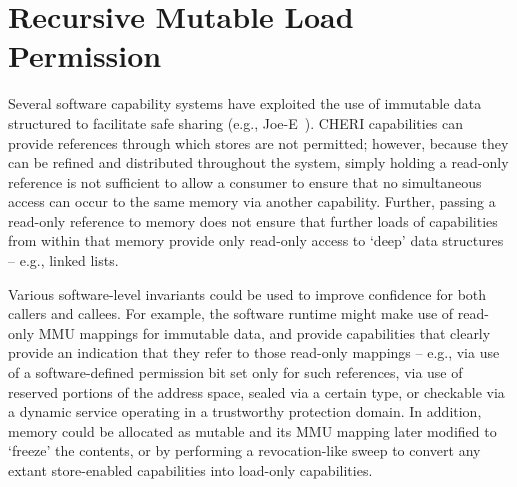 \section{Recursive Mutable Load Permission} %
\label{app:exp:recmutload}


Several software capability systems have exploited the use of immutable data
structured to facilitate safe sharing (e.g., Joe-E~\cite{mettler:joee}).
CHERI capabilities can provide references through which stores are not
permitted; however, because they can be refined and distributed throughout the
system, simply holding a read-only reference is not sufficient to allow a
consumer to ensure that no simultaneous access can occur to the same memory
via another capability.
Further, passing a read-only reference to memory does not ensure that further
loads of capabilities from within that memory provide only read-only access to
`deep' data structures -- e.g., linked lists.

Various software-level invariants could be used to improve confidence for both
callers and callees.
For example, the software runtime might make use of read-only MMU mappings for
immutable data, and provide capabilities that clearly provide an indication
that they refer to those read-only mappings -- e.g., via use of a
software-defined permission bit set only for such references, via use of
reserved portions of the address space, sealed via a certain type, or
checkable via a dynamic service operating in a trustworthy protection domain.
In addition, memory could be allocated as mutable and its MMU mapping later
modified to `freeze' the contents, or by performing a revocation-like sweep
to convert any extant store-enabled capabilities into load-only capabilities.


